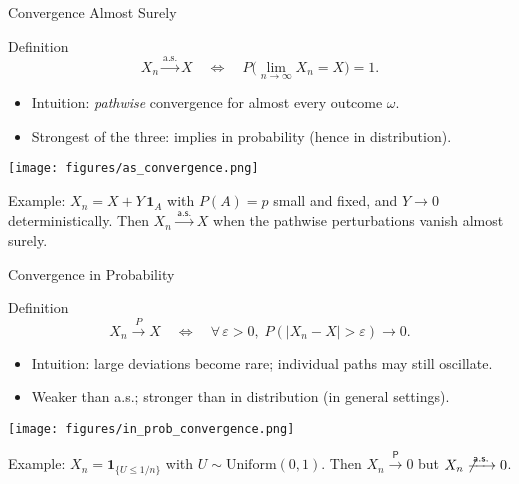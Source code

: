 \documentclass{beamer}
\def\P{P}%
\def\mathbb#1{#1}%
\renewcommand{\P}{\mathbb{P}}
\newcommand{\1}{\mathbf{1}}
\newcommand{\toP}{\xrightarrow{\,\mathsf{P}\,}}
\newcommand{\toas}{\xrightarrow{\,\mathsf{a.s.}\,}}
\begin{document}
\begin{frame}{Convergence Almost Surely}
  \begin{block}{Definition}
    \[ X_n \xrightarrow{\text{a.s.}} X \quad \iff \quad \mathbb{P}\big(\lim_{n\to\infty} X_n = X\big) = 1. \]
  \end{block}
  \begin{itemize}
    \item Intuition: \emph{pathwise} convergence for almost every outcome $\omega$.
    \item Strongest of the three: implies in probability (hence in distribution).
  \end{itemize}
  \begin{center}
    \texttt{[image: figures/as\_convergence.png]}
  \end{center}
  \medskip
  {\footnotesize Example: $X_n = X + Y\,\mathbf 1_{A}$ with $\P(A)=p$ small and fixed, and $Y\to 0$ deterministically. Then $X_n\toas X$ when the pathwise perturbations vanish almost surely.}
\end{frame}

\begin{frame}{Convergence in Probability}
  \footnotesize
  \begin{block}{Definition}
    \[ X_n \xrightarrow{\mathbb{P}} X \quad \iff \quad \forall \, \varepsilon > 0,\; \mathbb{P}(|X_n - X| > \varepsilon) \to 0. \]
  \end{block}
  \begin{itemize}
    \item Intuition: large deviations become rare; individual paths may still oscillate.
    \item Weaker than a.s.; stronger than in distribution (in general settings).
  \end{itemize}
  \begin{center}
    \texttt{[image: figures/in\_prob\_convergence.png]}
  \end{center}
  {\footnotesize Example: $X_n=\mathbf 1_{\{U\le 1/n\}}$ with $U\sim\mathrm{Uniform}(0,1)$. Then $X_n\toP 0$ but $X_n\not\toas 0$.}
\end{frame}
\end{document}
